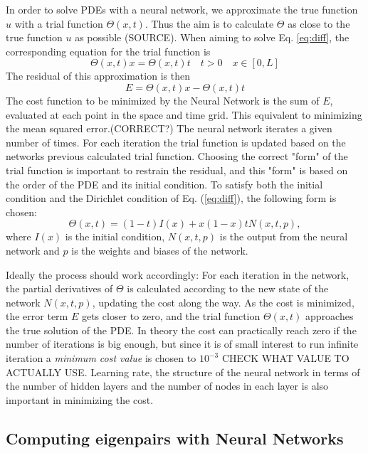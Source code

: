 \documentclass[a4paper,11pt,twocolumn]{article}
\begin{document}
In order to solve PDEs with a neural network, we approximate the true function $u$ with a trial function $\Theta (x,t)$. Thus the aim is to calculate $\Theta$ as close to the true function $u$ as possible \cite{lagaris1998artificial} (SOURCE). When aiming to solve Eq. \eqref{eq:diff}, the corresponding equation for the trial function is
\begin{equation*}
   {\Theta(x,t)}{x} = {\Theta(x,t)}{t} \quad t>0 \quad x\in [0,L]
\end{equation*}
The residual of this approximation is then
\begin{equation}
    E = {\Theta(x,t)}{x} - {\Theta(x,t)}{t}
    \label{eq:error}
\end{equation}
The cost function to be minimized by the Neural Network is the sum of $E$, evaluated at each point in the space and time grid. This equivalent to minimizing the mean squared error.(CORRECT?) The neural network iterates a given number of times. For each iteration the trial function is updated based on the networks previous calculated trial function. Choosing the correct "form" of the trial function is important to restrain the residual, and this "form" is based on the order of the PDE and its initial condition. To satisfy both the initial condition and the Dirichlet condition of Eq. (\ref{eq:diff}), the following form is chosen:
\begin{equation}
    \Theta (x,t) = (1-t)I(x) + x(1-x)tN(x,t,p),
    \label{eq:trial}
\end{equation}
where $I(x)$ is the initial condition, $N(x,t,p)$ is the output from the neural network and $p$ is the weights and biases of the network. 

Ideally the process should work accordingly: For each iteration in the network, the partial derivatives of $\Theta$ is calculated according to the new state of the network $N(x, t, p)$, updating the cost along the way. As the cost is minimized, the error term $E$ gets closer to zero, and the trial function $\Theta (x,t)$ approaches the true solution of the PDE. In theory the cost can practically reach zero if the number of iterations is big enough, but since it is of small interest to run infinite iteration a \textit{minimum cost value} is chosen to $10^{-3}$ CHECK WHAT VALUE TO ACTUALLY USE. Learning rate, the structure of the neural network in terms of the number of hidden layers and the number of nodes in each layer is also important in minimizing the cost. 

\subsection{Computing eigenpairs with Neural Networks}
\end{document}
